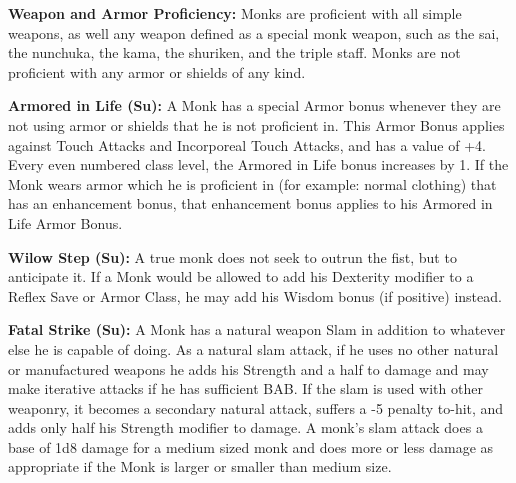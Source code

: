 \documentclass[10pt]{article}
\newcommand{\ability}[2]{\smallskip \noindent \textbf{#1} #2}
\begin{document}
\ability{Weapon and Armor Proficiency:}{Monks are proficient with all simple weapons, as well any weapon defined as a special monk weapon, such as the sai, the nunchuka, the kama, the shuriken, and the triple staff. Monks are not proficient with any armor or shields of any kind.}

\ability{Armored in Life (Su):}{A Monk has a special Armor bonus whenever they are not using armor or shields that he is not proficient in. This Armor Bonus applies against Touch Attacks and Incorporeal Touch Attacks, and has a value of +4. Every even numbered class level, the Armored in Life bonus increases by 1. If the Monk wears armor which he is proficient in (for example: normal clothing) that has an enhancement bonus, that enhancement bonus applies to his Armored in Life Armor Bonus.}

\ability{Wilow Step (Su):}{A true monk does not seek to outrun the fist, but to anticipate it. If a Monk would be allowed to add his Dexterity modifier to a Reflex Save or Armor Class, he may add his Wisdom bonus (if positive) instead.}

\ability{Fatal Strike (Su):}{A Monk has a natural weapon Slam in addition to whatever else he is capable of doing. As a natural slam attack, if he uses no other natural or manufactured weapons he adds his Strength and a half to damage and may make iterative attacks if he has sufficient BAB. If the slam is used with other weaponry, it becomes a secondary natural attack, suffers a -5 penalty to-hit, and adds only half his Strength modifier to damage. A monk's slam attack does a base of 1d8 damage for a medium sized monk and does more or less damage as appropriate if the Monk is larger or smaller than medium size.}
\end{document}
